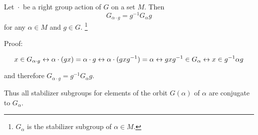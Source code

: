 \documentclass[12pt]{article}
\begin{document}
Let $\operatorname{\cdot}$ be a right group action of $G$ on a set $M$. Then
\begin{displaymath}
G_{\alpha \cdot g} =g^{-1}G_{\alpha}g
\end{displaymath}
for any $\alpha \in M$ and $g \in G$. \footnote{$G_{\alpha}$ is the stabilizer subgroup of $\alpha \in M$.}

Proof:

\[
x \in G_{\alpha\cdot g} \leftrightarrow \alpha\cdot (gx) = \alpha \cdot g
 \leftrightarrow \alpha \cdot (gxg^{-1}) = \alpha \leftrightarrow gxg^{-1} \in
 G_{\alpha} \\ \leftrightarrow x \in g^{-1}\alpha g\]

and therefore $G_{\alpha\cdot g} =g^{-1}G_{\alpha}g$.

Thus all stabilizer subgroups for elements of the orbit $G(\alpha)$ of $\alpha$
are conjugate to $G_{\alpha}$.
\end{document}
